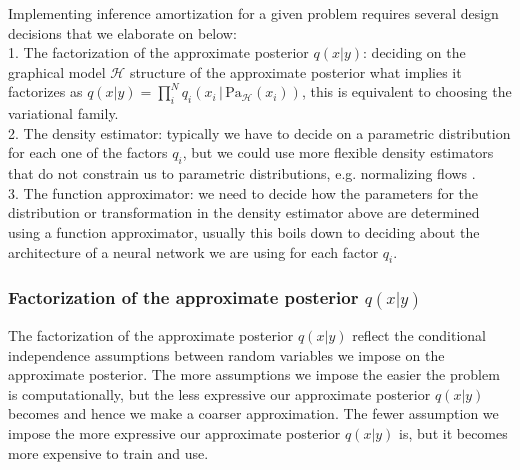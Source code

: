 \documentclass[12pt]{article}
\begin{document}
Implementing inference amortization for a given problem requires several design decisions that we elaborate on below:\\
1. The factorization of the approximate posterior $q(x|y)$: deciding on the graphical model $\mathcal{H}$ structure of the approximate posterior what implies it factorizes as $q(x|y)=\prod^N_iq_i(x_i\,|\,\text{Pa}_\mathcal{H}(x_i))$, this is equivalent to choosing the variational family.\\
2. The density estimator: typically we have to decide on a parametric distribution for each one of the factors $q_i$, but we could use more flexible density estimators that do not constrain us to parametric distributions, e.g. normalizing flows \citep{RezendeMohamed2015}. \\
3. The function approximator: we need to decide how the parameters for the distribution or transformation in the density estimator above are determined using a function approximator, usually this boils down to deciding about the architecture of a neural network we are using for each factor $q_i$.\\




\subsubsection*{Factorization of the approximate posterior $q(x|y)$}
The factorization of the approximate posterior $q(x|y)$ reflect the conditional independence assumptions between random variables we impose on the approximate posterior.
The more assumptions we impose the easier the problem is computationally, but the less expressive our approximate posterior $q(x|y)$ becomes and hence we make a coarser approximation.
The fewer assumption we impose the more expressive our approximate posterior $q(x|y)$ is, but it becomes more expensive to train and use.
\end{document}
